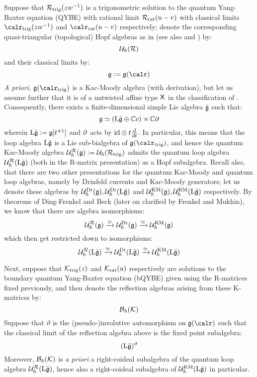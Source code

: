             Suppose that $\mathcal{R}_{\mathrm{trig}}(zw^{-1})$ is a trigonometric solution to the quantum Yang-Baxter equation (QYBE) with rational limit $\mathcal{R}_{\mathrm{rat}}(u - v)$ with classical limits $\calr_{\trigonometric}(zw^{-1})$ and $\calr_{\rational}(u - v)$ respectively; denote the corresponding quasi-triangular (topological) Hopf algebras as in \cite{etingof_kazhdan_quantisation_1} (see also \cite{etingof_kazhdan_quantisation_1} and \cite{etingof_kazhdan_quantisation_6}) by:
                $$\mathcal{U}_{\hbar}(\mathcal{R})$$
            and their classical limits by:
                $$\g := \g(\calr)$$
            \textit{A priori}, $\g(\calr_{\trigonometric})$ is a Kac-Moody algebra (with derivation), but let us assume further that it is of a untwisted affine type $\mathsf{X}$ in the classification of \cite[Chapter 4]{kac_infinite_dimensional_lie_algebras}. Consequently, there exists a finite-dimensional simple Lie algebra $\bar{\mathfrak{g}}$ such that:
                $$\mathfrak{g} \simeq ( \mathrm{L} \bar{\mathfrak{g}} \oplus \mathbb{C} c ) \rtimes \mathbb{C} \partial$$
            wherein $\mathrm{L} \bar{\mathfrak{g}} := \mathfrak{g}[t^{\pm 1}]$ and $\partial$ acts by $\id \tensor t\frac{d}{dt}$. In particular, this means that the loop algebra $\mathrm{L} \bar{\mathfrak{g}}$ is a Lie sub-bialgebra of $\g(\calr_{\trigonometric})$, and hence the quantum Kac-Moody algebra $\mathcal{U}_{\hbar}^{\mathcal{R}}(\mathfrak{g}) := \mathcal{U}_{\hbar}(\mathcal{R}_{\mathrm{trig}})$ admits the quantum loop algebra $\mathcal{U}_{\hbar}^{\mathcal{R}}(\mathrm{L} \bar{\mathfrak{g}})$ (both in the R-matrix presentation) as a Hopf subalgebra. Recall also, that there are two other presentations for the quantum Kac-Moody and quantum loop algebras, namely by Drinfeld currents and Kac-Moody generators; let us denote these algebras by $\mathcal{U}_{\hbar}^{\mathrm{Dr}}(\mathfrak{g}), \mathcal{U}_{\hbar}^{\mathrm{Dr}}(\mathrm{L} \bar{\mathfrak{g}})$ and $\mathcal{U}_{\hbar}^{\mathrm{KM}}(\mathfrak{g}), \mathcal{U}_{\hbar}^{\mathrm{KM}}(\mathrm{L} \bar{\mathfrak{g}})$ respectively. By theorems of Ding-Frenkel and Beck (later on clarified by Frenkel and Mukhin), we know that there are algebra isomorphisms:
                $$\mathcal{U}_{\hbar}^{\mathcal{R}}(\mathfrak{g}) \xrightarrow[]{\simeq} \mathcal{U}_{\hbar}^{\mathrm{Dr}}(\mathfrak{g}) \xrightarrow[]{\simeq} \mathcal{U}_{\hbar}^{\mathrm{KM}}(\mathfrak{g})$$
            which then get restricted down to isomorphisms:
                $$\mathcal{U}_{\hbar}^{\mathcal{R}}(\mathrm{L} \bar{\mathfrak{g}}) \xrightarrow[]{\simeq} \mathcal{U}_{\hbar}^{\mathrm{Dr}}(\mathrm{L} \bar{\mathfrak{g}}) \xrightarrow[]{\simeq} \mathcal{U}_{\hbar}^{\mathrm{KM}}(\mathrm{L} \bar{\mathfrak{g}})$$
                
            Next, suppose that $\mathcal{K}_{\mathrm{trig}}(z)$ and $\mathcal{K}_{\mathrm{rat}}(u)$ respectively are solutions to the boundary quantum Yang-Baxter equation (bQYBE) given using the R-matrices fixed previously, and then denote the reflection algebras arising from these K-matrices by:
                $$\mathcal{B}_{\hbar}(\mathcal{K})$$
            Suppose that $\vartheta$ is the (pseudo-)involutive automorphism on $\g(\calr)$ such that the classical limit of the reflection algebra above is the fixed point subalgebra:
                $$(\mathrm{L} \bar{\mathfrak{g}})^{\vartheta}$$
            Moreover, $\mathcal{B}_{\hbar}(\mathcal{K})$ is \textit{a priori} a right-coideal subalgebra of the quantum loop algebra $\mathcal{U}_{\hbar}^{\mathcal{R}}(\mathrm{L} \bar{\mathfrak{g}})$, hence also a right-coideal subalgebra of $\mathcal{U}_{\hbar}^{\mathrm{KM}}(\mathrm{L} \bar{\mathfrak{g}})$ in particular.


